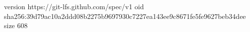 version https://git-lfs.github.com/spec/v1
oid sha256:39d79ac10a2ddd08b2275b9697930c7227ea143ee9c8671fe5fe9627beb34dee
size 608

